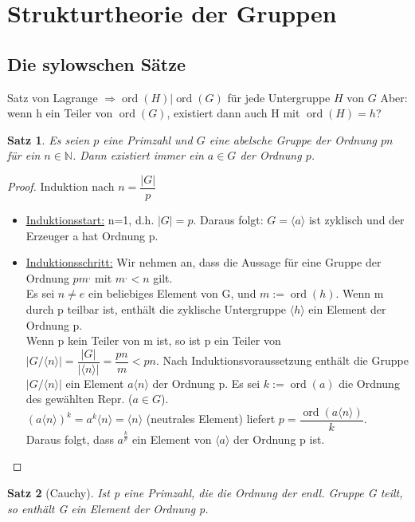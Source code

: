 \documentclass[12pt]{scrartcl}%
\newtheorem{thm}{Satz}
\theoremstyle{definition}
\theoremstyle{remark}
\DeclareMathOperator\ord{ord}
\begin{document}
\section{Strukturtheorie der Gruppen}

\subsection{Die sylowschen Sätze}

Satz von Lagrange $\Rightarrow \ord(H)|\ord(G)$ für jede Untergruppe $H$ von $G$
Aber: wenn h ein Teiler von $\ord(G)$, existiert dann auch H mit $\ord(H)=h$?

\begin{thm}
Es seien $p$ eine Primzahl und $G$ eine abelsche Gruppe der Ordnung $pn$ für ein $n\in\mathbb{N}$. Dann existiert immer ein $a \in G$ der Ordnung $p$.
\end{thm}

\begin{proof}
Induktion nach $n=\dfrac{|G|}{p}$
\begin{itemize}
\item \underline{Induktionsstart:} n=1, d.h. $|G|=p$. Daraus folgt: $G=\langle a\rangle$ ist zyklisch und der Erzeuger a hat Ordnung p.
\item \underline{Induktionsschritt:} Wir nehmen an, dass die Aussage für eine Gruppe der Ordnung $pm^,$ mit $m^,<n$ gilt.\\
Es sei $n\neq e$ ein beliebiges Element von G, und $m:=\ord(h)$. Wenn m durch p teilbar ist, enthält die zyklische Untergruppe $\langle h\rangle$ ein Element der Ordnung p. \\
Wenn p kein Teiler von m ist, so ist p ein Teiler von $|G/\langle n\rangle|=\dfrac{|G|}{|\langle n\rangle|}=\dfrac{pn}{m}<pn$. Nach Induktionsvoraussetzung enthält die Gruppe $|G/\langle n\rangle|$ ein Element $a\langle n\rangle$ der Ordnung p. Es sei $k:=\ord(a)$ die Ordnung des gewählten Repr. ($a \in G$). \\
$(a\langle n\rangle)^k=a^k\langle n\rangle=\langle n\rangle$ (neutrales Element) liefert $ p = \dfrac{\ord(a\langle n\rangle)}{k}$. \\
Daraus folgt, dass $a^{\frac{k}{p}}$ ein Element von $\langle a\rangle$ der Ordnung p ist.
\end{itemize}
\end{proof}

\begin{thm} [Cauchy]
Ist p eine Primzahl, die die Ordnung der endl. Gruppe G teilt, so enthält G ein Element der Ordnung p.
\end{thm}
\end{document}
